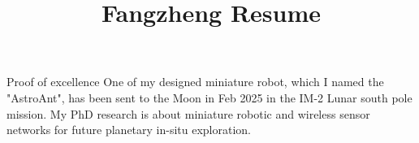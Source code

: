 \documentclass{resume} %
\begin{document}
\title{Fangzheng Resume}

\begin{rSection}{Proof of excellence}
      One of my designed miniature robot, which I named the "AstroAnt",
      has been sent to the Moon in Feb 2025 in the IM-2 Lunar south pole mission.
      My PhD research is about miniature robotic and wireless sensor networks for future planetary in-situ exploration.
\end{rSection}
\end{document}
